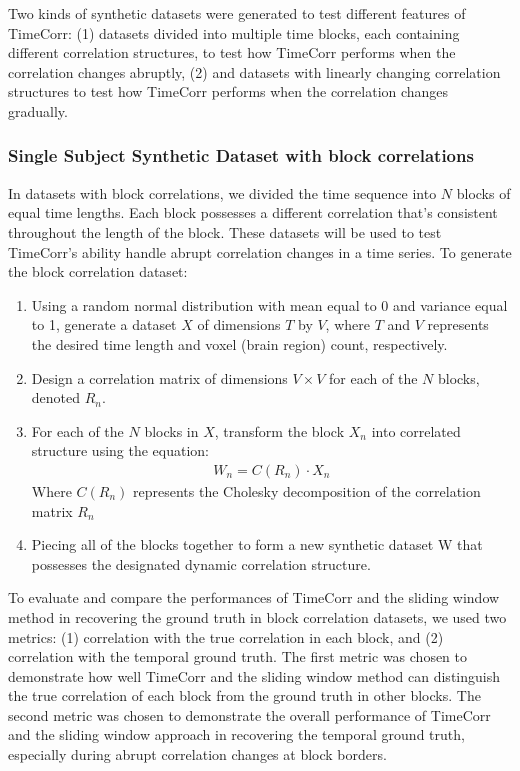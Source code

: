 \documentclass[11pt]{article}
\begin{document}
Two kinds of synthetic datasets were generated to test different features of TimeCorr: (1) datasets divided into multiple time blocks, each containing different correlation structures, to test how TimeCorr performs when the correlation changes abruptly, (2) and datasets with linearly changing correlation structures to test how TimeCorr performs when the correlation changes gradually.

\subsubsection{Single Subject Synthetic Dataset with block correlations}

In datasets with block correlations, we divided the time sequence into $N$ blocks of equal time lengths. Each block possesses a different correlation that's consistent throughout the length of the block. These datasets will be used to test TimeCorr's ability handle abrupt correlation changes in a time series. To generate the block correlation dataset:
\begin{enumerate}
\item Using a random normal distribution with mean equal to 0 and variance equal to 1, generate a dataset $X$ of dimensions $T$ by $V$, where $T$ and $V$ represents the desired time length and voxel (brain region) count, respectively.
\item Design a correlation matrix of dimensions $V\times V$ for each of the $N$ blocks, denoted $R_n$.
\item For each of the $N$ blocks in $X$, transform the block $X_n$ into correlated structure using the equation:
\begin{align*}
W_n = C(R_n) \cdot X_n
\end{align*}
Where $C(R_n)$ represents the Cholesky decomposition of the correlation matrix $R_n$
\item Piecing all of the blocks together to form a new synthetic dataset W that possesses the designated dynamic correlation structure.
\end{enumerate}

To evaluate and compare the performances of TimeCorr and the sliding window method in recovering the ground truth in block correlation datasets, we used two metrics: (1) correlation with the true correlation in each block, and (2) correlation with the temporal ground truth. The first metric was chosen to demonstrate how well TimeCorr and the sliding window method can distinguish the true correlation of each block from the ground truth in other blocks. The second metric was chosen to demonstrate the overall performance of TimeCorr and the sliding window approach in recovering the temporal ground truth, especially during abrupt correlation changes at block borders.
\end{document}
